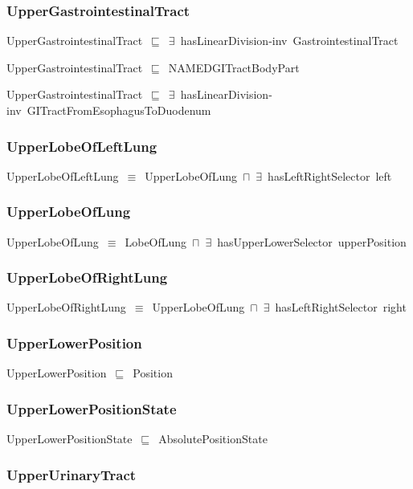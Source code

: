 \documentclass{article}
\begin{document}
\subsubsection*{UpperGastrointestinalTract}

UpperGastrointestinalTract~\ensuremath{\sqsubseteq}~\ensuremath{\exists}~hasLinearDivision-inv~GastrointestinalTract~

UpperGastrointestinalTract~\ensuremath{\sqsubseteq}~NAMEDGITractBodyPart~

UpperGastrointestinalTract~\ensuremath{\sqsubseteq}~\ensuremath{\exists}~hasLinearDivision-inv~GITractFromEsophagusToDuodenum~

\subsubsection*{UpperLobeOfLeftLung}

UpperLobeOfLeftLung~\ensuremath{\equiv}~UpperLobeOfLung~\ensuremath{\sqcap}~\ensuremath{\exists}~hasLeftRightSelector~left

\subsubsection*{UpperLobeOfLung}

UpperLobeOfLung~\ensuremath{\equiv}~LobeOfLung~\ensuremath{\sqcap}~\ensuremath{\exists}~hasUpperLowerSelector~upperPosition

\subsubsection*{UpperLobeOfRightLung}

UpperLobeOfRightLung~\ensuremath{\equiv}~UpperLobeOfLung~\ensuremath{\sqcap}~\ensuremath{\exists}~hasLeftRightSelector~right

\subsubsection*{UpperLowerPosition}

UpperLowerPosition~\ensuremath{\sqsubseteq}~Position~

\subsubsection*{UpperLowerPositionState}

UpperLowerPositionState~\ensuremath{\sqsubseteq}~AbsolutePositionState~

\subsubsection*{UpperUrinaryTract}
\end{document}
